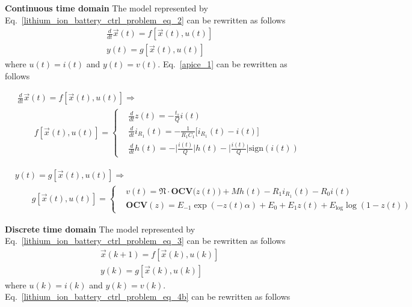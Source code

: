 \documentclass[11pt,a4paper,oneside]{book}
\numberwithin{equation}{section}
\newcommand{\abs}[1]{\big|#1\big|}
\newcommand{\sign}{\text{sign}}
\theoremstyle{it}
\theoremstyle{definition}
\begin{document}
\vspace{5mm}
\noindent\textbf{Continuous time domain}
The model represented by Eq.~\eqref{lithium_ion_battery_ctrl_problem_eq_2} can 
be rewritten as follows
\begin{equation}
	\begin{aligned}\label{apice_1}
		&\frac{d}{dt}\vec{x}(t)=f[\vec{x}(t),u(t)] \\[6pt]
		&y(t)=g[\vec{x}(t),u(t)]
	\end{aligned}
\end{equation}
where $u(t)=i(t)$ and $y(t)=v(t)$. Eq.~\eqref{apice_1} can be rewritten as 
follows

\begin{equation}
	\begin{aligned}\label{apice_2}
		&\frac{d}{dt}\vec{x}(t)=f[\vec{x}(t),u(t)] \Rightarrow  \\[6pt]
		& \qquad f[\vec{x}(t),u(t)]=
		\left\lbrace \begin{aligned}
			&	\frac{d}{dt}z(t) = -\frac{t_s}{Q}i(t) \\[6pt]
			&	\frac{d}{dt}i_{R_1}(t) = -\frac{1}{R_1C_1}\Big[i_{R_1}(t)-i(t)\Big] \\[6pt]
			&	\frac{d}{dt}h(t) = -\abs{\frac{i(t)}{Q}}h(t) 
			-\abs{\frac{i(t)}{Q}}\sign(i(t))
		\end{aligned}\right.
	\end{aligned}
\end{equation}

\begin{equation}\label{apice_3}
	\begin{aligned}
		&y(t)=g[\vec{x}(t),u(t)] \Rightarrow \\[6pt]
		& \qquad g[\vec{x}(t),u(t)]=
		\left\lbrace \begin{aligned}
			& v(t) = \mathfrak{N}\cdot\mathbf{OCV}\Big(z(t)\Big) +Mh(t)-R_1i_{R_1}(t) - R_0i(t) \\[6pt]
			& \mathbf{OCV}(z) = E_{-1}\exp(-z(t)\alpha) + E_0 + E_1z(t) +  E_\text{log}\log({1-z(t)})
		\end{aligned}\right.
	\end{aligned}
\end{equation}

\vspace{5mm}
\noindent\textbf{Discrete time domain}
The model represented by Eq.~\eqref{lithium_ion_battery_ctrl_problem_eq_3} can be rewritten as follows
\begin{equation}
	\begin{aligned}\label{lithium_ion_battery_ctrl_problem_eq_4b}
		&\vec{x}(k+1)=f[\vec{x}(k),u(k)] \\[6pt]
		&y(k)=g[\vec{x}(k),u(k)]
	\end{aligned}
\end{equation}
where $u(k)=i(k)$ and $y(k)=v(k)$. Eq.~\eqref{lithium_ion_battery_ctrl_problem_eq_4b} can be rewritten as follows
\end{document}
